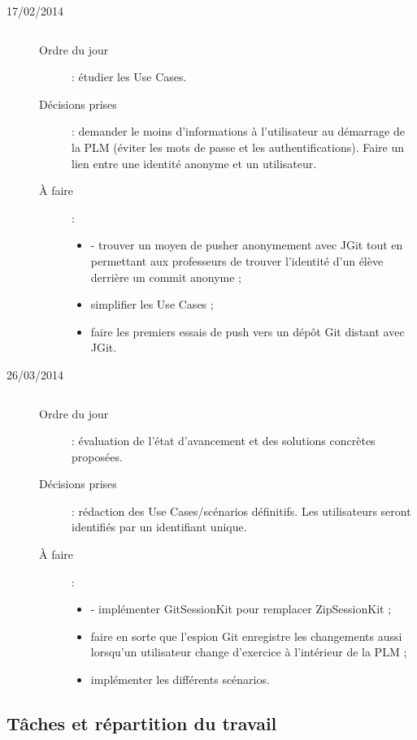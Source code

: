 \begin{description}
\item[17/02/2014] $ $
	\begin{description}
	\item[Ordre du jour] : étudier les Use Cases.
	\item[Décisions prises] : demander le moins d'informations à l'utilisateur au démarrage de la PLM (éviter les mots de passe et les authentifications). Faire un lien entre une identité anonyme et un utilisateur.
	\item[À faire] : $ $
		\begin{itemize}
		\item - trouver un moyen de pusher anonymement avec JGit tout en permettant aux professeurs de trouver l'identité d'un élève derrière un commit anonyme ;
		\item simplifier les Use Cases ;
		\item  faire les premiers essais de push vers un dépôt Git distant avec JGit.
		\end{itemize}
	\end{description}
\end{description}

\begin{description}
\item[26/03/2014] $ $
	\begin{description}
	\item[Ordre du jour] : évaluation de l'état d'avancement et des solutions concrètes proposées.
	\item[Décisions prises] : rédaction des Use Cases/scénarios définitifs. Les utilisateurs seront identifiés par un identifiant unique.
	\item[À faire] : $ $
		\begin{itemize}
		\item - implémenter GitSessionKit pour remplacer ZipSessionKit ;
		\item faire en sorte que l'espion Git enregistre les changements aussi lorsqu'un utilisateur change d'exercice à l'intérieur de la PLM ;
		\item implémenter les différents scénarios.
		\end{itemize}
	\end{description}
\end{description}

\subsection{Tâches et répartition du travail}

